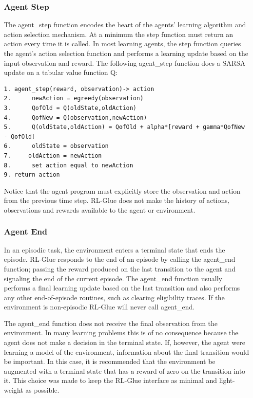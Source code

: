 \documentclass[11pt]{article}
\begin{document}
\subsubsection{Agent Step}
The agent\_step function encodes the heart of the agents' learning algorithm and action selection mechanism. At a minimum the step function must return an action every time it is called. In most learning agents, the step function queries the agent's action selection function and performs a learning update based on the input observation and reward. The following agent\_step function does a SARSA update on a tabular value function Q:
\begin{verbatim}
1. agent_step(reward, observation)-> action
2.      newAction = egreedy(observation)
3.      QofOld = Q(oldState,oldAction)
4.      QofNew = Q(observation,newAction) 
5.      Q(oldState,oldAction) = QofOld + alpha*[reward + gamma*QofNew - QofOld]
6.      oldState = observation
7.     oldAction = newAction
8.      set action equal to newAction
9. return action
\end{verbatim}  
Notice that the agent program must explicitly store the observation and action from the previous time step. RL-Glue does not make the history of actions, observations and rewards available to the agent or environment.

\subsubsection{Agent End}
In an episodic task, the environment enters a terminal state that ends the episode. RL-Glue responds to the end of an episode by calling the agent\_end function; passing the reward produced on the last transition to the agent and signaling the end of the current episode. The agent\_end function usually performs a final learning update based on the last transition and also performs any other end-of-episode routines, such as clearing eligibility traces. If the environment is non-episodic RL-Glue will never call agent\_end.

The agent\_end function does not receive the final observation from the environment. In many learning problems this is of no consequence because the agent does not make a decision in the terminal state. If, however, the agent were learning a model of the environment, information about the final transition would be important. In this case, it is recommended that the environment be augmented with a terminal state that has a reward of zero on the transition into it. This choice was made to keep the RL-Glue interface as minimal and light-weight as possible. 
\end{document}
